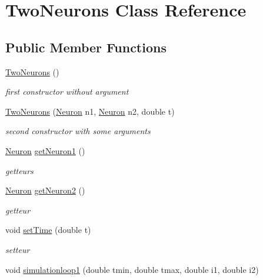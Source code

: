 \hypertarget{classTwoNeurons}{\section{Two\-Neurons Class Reference}
\label{classTwoNeurons}
}
\subsection*{Public Member Functions}
\begin{DoxyCompactItemize}
\item 
\hypertarget{classTwoNeurons_a8598c5d4c84faaafd58499cf49081b2a}{\hyperlink{classTwoNeurons_a8598c5d4c84faaafd58499cf49081b2a}{Two\-Neurons} ()}\label{classTwoNeurons_a8598c5d4c84faaafd58499cf49081b2a}

\begin{DoxyCompactList}\small\item\em first constructor without argument \end{DoxyCompactList}\item 
\hyperlink{classTwoNeurons_a3b5013b6a44f0e125245e46571955661}{Two\-Neurons} (\hyperlink{classNeuron}{Neuron} n1, \hyperlink{classNeuron}{Neuron} n2, double t)
\begin{DoxyCompactList}\small\item\em second constructor with some arguments \end{DoxyCompactList}\item 
\hyperlink{classNeuron}{Neuron} \hyperlink{classTwoNeurons_ab1904a55d7ef62ddd3e1d95f74436944}{get\-Neuron1} ()
\begin{DoxyCompactList}\small\item\em getteurs \end{DoxyCompactList}\item 
\hyperlink{classNeuron}{Neuron} \hyperlink{classTwoNeurons_aa934ca7ed7e9ac51476b0a421d3730c6}{get\-Neuron2} ()
\begin{DoxyCompactList}\small\item\em getteur \end{DoxyCompactList}\item 
void \hyperlink{classTwoNeurons_a20dd786e22fa6cc02d76a84c412d4204}{set\-Time} (double t)
\begin{DoxyCompactList}\small\item\em setteur \end{DoxyCompactList}\item 
void \hyperlink{classTwoNeurons_ad7cb069e757a08d6c069b78de52dcc6e}{simulationloop1} (double tmin, double tmax, double i1, double i2)

\end{DoxyCompactItemize}
